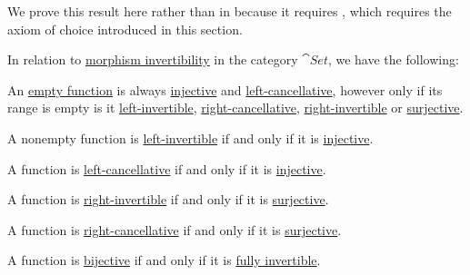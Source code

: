 \begin{proposition}\label{thm:function_invertibility_categorical}
  We prove this result here rather than in  because it requires , which requires the axiom of choice introduced in this section.

  In relation to \hyperref[def:morphism_invertibility]{morphism invertibility} in the category \hyperref[def:category_of_small_sets]{\( \cat{Set} \)}, we have the following:
  \begin{thmenum}
     An \hyperref[def:multi_valued_function/empty]{empty function} is always \hyperref[def:function_invertibility/injective]{injective} and \hyperref[def:morphism_invertibility/left_cancellative]{left-cancellative}, however only if its range is empty is it \hyperref[def:morphism_invertibility/left_invertible]{left-invertible}, \hyperref[def:morphism_invertibility/right_cancellative]{right-cancellative}, \hyperref[def:morphism_invertibility/right_invertible]{right-invertible} or \hyperref[def:function_invertibility/surjective]{surjective}.

     A nonempty function is \hyperref[def:morphism_invertibility/left_invertible]{left-invertible} if and only if it is \hyperref[def:function_invertibility/injective]{injective}.

     A function is \hyperref[def:morphism_invertibility/left_cancellative]{left-cancellative} if and only if it is \hyperref[def:function_invertibility/injective]{injective}.

     A function is \hyperref[def:morphism_invertibility/right_invertible]{right-invertible} if and only if it is \hyperref[def:function_invertibility/surjective]{surjective}.

     A function is \hyperref[def:morphism_invertibility/right_cancellative]{right-cancellative} if and only if it is \hyperref[def:function_invertibility/surjective]{surjective}.

     A function is \hyperref[def:function_invertibility/bijective]{bijective} if and only if it is \hyperref[def:morphism_invertibility/isomorphism]{fully invertible}.
  \end{thmenum}
\end{proposition}
